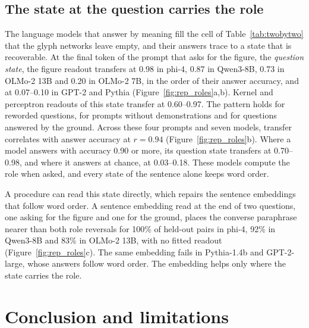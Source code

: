 \documentclass[10pt]{article}
\theoremstyle{plain}
\theoremstyle{remark}
\begin{document}
\subsection{The state at the question carries the role}
\label{sec:behavior}

The language models that answer by meaning fill the cell of Table~\ref{tab:twobytwo} that the glyph networks leave empty, and their answers trace to a state that is recoverable. At the final token of the prompt that asks for the figure, the \emph{question state}, the figure readout transfers at 0.98 in phi-4, 0.87 in Qwen3-8B, 0.73 in OLMo-2 13B and 0.20 in OLMo-2 7B, in the order of their answer accuracy, and at 0.07--0.10 in GPT-2 and Pythia (Figure~\ref{fig:rep_roles}a,b). Kernel and perceptron readouts of this state transfer at 0.60--0.97. The pattern holds for reworded questions, for prompts without demonstrations and for questions answered by the ground. Across these four prompts and seven models, transfer correlates with answer accuracy at $r = 0.94$ (Figure~\ref{fig:rep_roles}b). Where a model answers with accuracy 0.90 or more, its question state transfers at 0.70--0.98, and where it answers at chance, at 0.03--0.18. These models compute the role when asked, and every state of the sentence alone keeps word order.

A procedure can read this state directly, which repairs the sentence embeddings that follow word order. A sentence embedding read at the end of two questions, one asking for the figure and one for the ground, places the converse paraphrase nearer than both role reversals for 100\% of held-out pairs in phi-4, 92\% in Qwen3-8B and 83\% in OLMo-2 13B, with no fitted readout (Figure~\ref{fig:rep_roles}c). The same embedding fails in Pythia-1.4b and GPT-2-large, whose answers follow word order. The embedding helps only where the state carries the role.

\section{Conclusion and limitations}
\label{sec:discussion}
\end{document}
